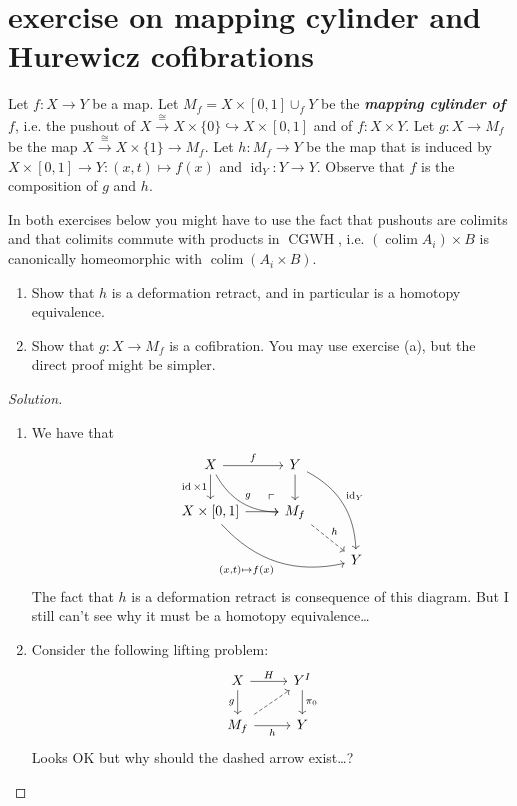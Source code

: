 \documentclass{article}
\numberwithin{equation}{section}
\DeclareMathOperator{\id}{id}
\DeclareMathOperator{\CGWH}{CGWH}
\DeclareMathOperator{\colim}{colim}
\begin{document}
\section{exercise on mapping cylinder and Hurewicz cofibrations}
\begin{exercise}
	Let $f:X\to Y$ be a map. Let $M_f=X\times[0,1]\cup_fY$ be the \textbf{\textit{mapping cylinder of $f$}}, i.e. the pushout of $X\overset{\cong}{\to}X\times\{0\}\hookrightarrow X\times[0,1]$ and of $f:X\times Y$.
	Let $g:X\to M_f$ be the map $X\overset{\cong}{\to}X\times\{1\}\to M_f$. Let $h:M_f\to Y$ be the map that is induced by $X\times[0,1]\to Y:(x,t)\mapsto f(x)$ and $\id_Y:Y\to Y$. Observe that $f$ is the composition of $g$ and $h$.
	
	In both exercises below you might have to use the fact that pushouts are colimits and that colimits commute with products in $\CGWH$, i.e. $(\colim A_i)\times B$ is canonically homeomorphic with $\colim(A_i \times B)$.
	\begin{enumerate}
		\item Show that $h$ is a deformation retract, and in particular is a homotopy equivalence.
		\item Show that $g : X \to M_f$ is a cofibration. You may use exercise (a), but the direct proof might be simpler.
	\end{enumerate}
\end{exercise}
\begin{proof}[Solution]\leavevmode
	\begin{enumerate}
		\item We have that
		\[\begin{tikzcd}
			X\arrow[r,"f"]\arrow[d,swap,"\id\times 1"]\arrow[rd,bend right,"g"]&Y\arrow[d]\arrow[ddr,bend left,"\id_Y"]\\
			X\times[0,1]\arrow[r,swap]\arrow[drr,bend right,swap,"(x\text{,}t)\mapsto f(x)"]&M_f\arrow[ul, phantom, "\ulcorner", very near start]\arrow[dr,dashed,"h"]\\
			&&Y
		\end{tikzcd}\]
		The fact that $h$ is a deformation retract is consequence of this diagram. {\color{red}But I still can't see why it must be a homotopy equivalence…}
		\item Consider the following lifting problem:
		\[\begin{tikzcd}
			X\arrow[d,"g",swap]\arrow[r,"H"]&Y^I\arrow[d,"\pi_0"]\\
			M_f\arrow[ur,dashed]\arrow[r,"h",swap]&Y
		\end{tikzcd}\]
		{\color{red}Looks OK but why should the dashed arrow exist…?}
	\end{enumerate}
\end{proof}
\end{document}
